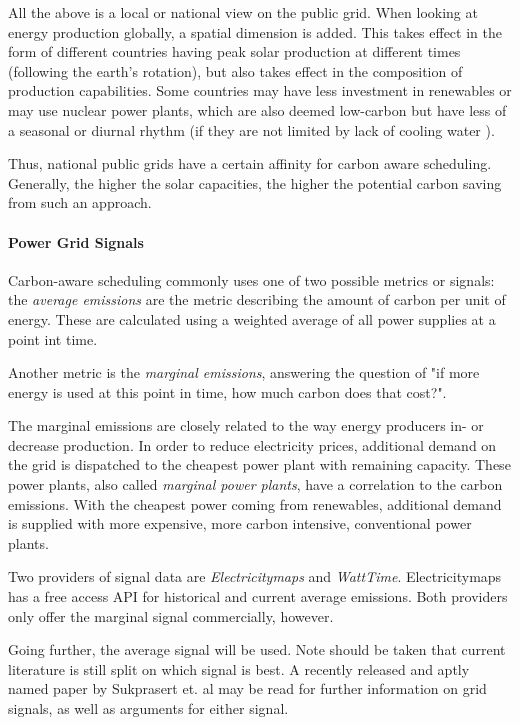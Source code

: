 All the above is a local or national view on the public grid. 
When looking at energy production globally, a spatial dimension is added. 
This takes effect in the form of different countries having peak solar production at different times (following the earth's rotation), but also takes effect in the composition of production capabilities.
Some countries may have less investment in renewables or may use nuclear power plants, which are also deemed low-carbon but have less of a seasonal or diurnal rhythm (if they are not limited by lack of cooling water ).

Thus, national public grids have a certain affinity for carbon aware scheduling\cite{wiesner_lets_2021}. Generally, the higher the solar capacities, the higher the potential carbon saving from such an approach. 

\paragraph{Power Grid Signals}
Carbon-aware scheduling commonly uses one of two possible metrics or signals: the \emph{average emissions} are the metric describing the amount of carbon per unit of energy. These are calculated using a weighted average of all power supplies at a point int time.

Another metric is the \emph{marginal emissions}, answering the question of "if more energy is used at this point in time, how much carbon does that cost?". 

The marginal emissions are closely related to the way energy producers in- or decrease production.
In order to reduce electricity prices, additional demand on the grid is dispatched to the cheapest power plant with remaining capacity. 
These power plants, also called \emph{marginal power plants}, have a correlation to the carbon emissions.
With the cheapest power coming from renewables, additional demand is supplied with more expensive, more carbon intensive, conventional power plants.

Two providers of signal data are \emph{Electricitymaps} and \emph{WattTime}.
Electricitymaps has a free access API for historical and current average emissions. Both providers only offer the marginal signal commercially, however. 

Going further, the average signal will be used. 
Note should be taken that current literature is still split on which signal is best. 
A recently released and aptly named paper by Sukprasert et. al \cite{sukprasert_limitations_2024} may be read for further information on grid signals, as well as arguments for either signal.

